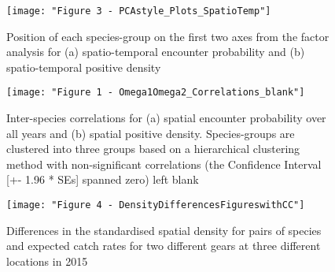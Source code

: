 \documentclass{nature}
\begin{document}
\begin{figure}
\begin{center}
	\texttt{[image: "Figure 3 - PCAstyle\_Plots\_SpatioTemp"]}
	\label{fig:2}
	\caption{Position of each species-group on the first two axes from the
		factor analysis for (a) spatio-temporal encounter probability
		and (b) spatio-temporal positive density}
\end{center}
\end{figure}

\begin{figure}
\begin{center}
	\texttt{[image: "Figure 1 - Omega1Omega2\_Correlations\_blank"]}
	\label{fig:3}
	\caption{Inter-species correlations for (a) spatial encounter
		probability over all years and (b) spatial positive density.
		Species-groups are clustered into three groups based on a
		hierarchical clustering method with non-significant
		correlations (the Confidence Interval [+- 1.96 * SEs] spanned
		zero) left blank}
	\end{center}
\end{figure}

\begin{figure}
\begin{center}
	\texttt{[image: "Figure 4 - DensityDifferencesFigureswithCC"]}
	\label{fig:4}
	\caption{Differences in the standardised spatial density for pairs of
		species and expected catch rates for two different gears at
		three different locations in 2015}
\end{center}
\end{figure}
\end{document}
